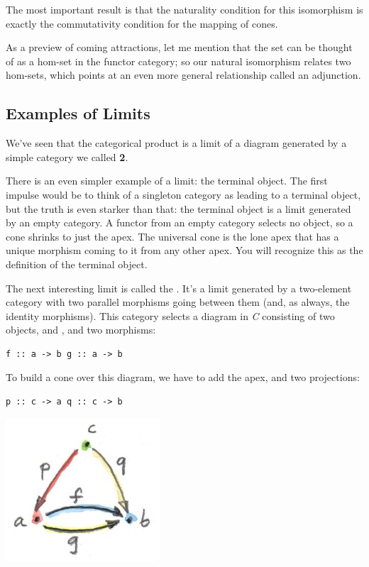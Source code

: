 The most important result is that the naturality condition for this
isomorphism is exactly the commutativity condition for the mapping of
cones.

As a preview of coming attractions, let me mention that the set
 can be thought of as a hom-set in the functor
category; so our natural isomorphism relates two hom-sets, which points
at an even more general relationship called an adjunction.

\subsection{Examples of Limits}\label{examples-of-limits}

We've seen that the categorical product is a limit of a diagram
generated by a simple category we called \textbf{2}.

There is an even simpler example of a limit: the terminal object. The
first impulse would be to think of a singleton category as leading to a
terminal object, but the truth is even starker than that: the terminal
object is a limit generated by an empty category. A functor from an
empty category selects no object, so a cone shrinks to just the apex.
The universal cone is the lone apex that has a unique morphism coming to
it from any other apex. You will recognize this as the definition of the
terminal object.

The next interesting limit is called the . It's a limit
generated by a two-element category with two parallel morphisms going
between them (and, as always, the identity morphisms). This category
selects a diagram in \emph{C} consisting of two objects,  and
, and two morphisms:

\begin{verbatim}
f :: a -> b g :: a -> b
\end{verbatim}

To build a cone over this diagram, we have to add the apex, 
and two projections:

\begin{verbatim}
p :: c -> a q :: c -> b
\end{verbatim}

\includegraphics[width=2.27083in]{images/equalizercone.jpg}

